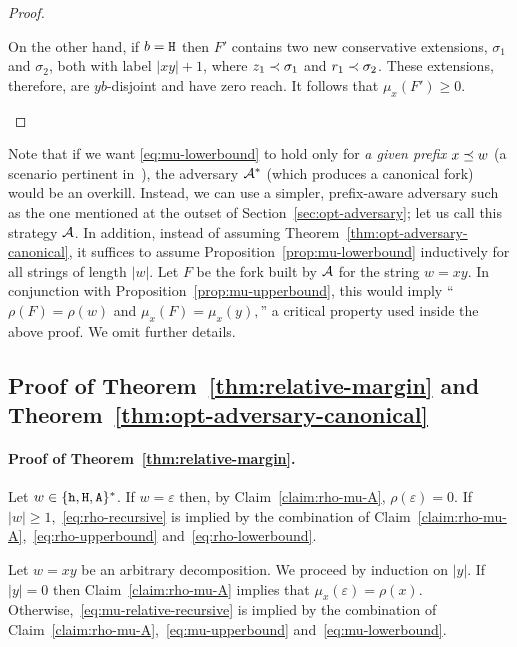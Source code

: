 \begin{proof}
\begin{description}[font=\normalfont\itshape\space]
      On the other hand, if $b = \mathtt{H}$ then 
      $F'$ contains two new conservative extensions, 
      $\sigma_1$ and $\sigma_2$, 
      both with label $|xy| + 1$, 
      where $z_1 \prec \sigma_1$ and $r_1 \prec \sigma_2$.  
      These extensions, therefore, are $yb$-disjoint 
      and have zero reach.
      It follows that $\mu_x(F') \geq 0$.
  \end{description}
\end{proof}


Note that 
if we want \eqref{eq:mu-lowerbound} 
to hold only for \emph{a given prefix} $x \preceq w$ 
(a scenario pertinent in~\cite{LinearConsistencySODA}), 
the adversary $\mathcal{A}^*$ 
(which produces a canonical fork) 
would be an overkill. 
Instead, 
we can use a simpler, prefix-aware adversary 
such as the one mentioned 
at the outset of Section~\ref{sec:opt-adversary}; 
let us call this strategy $\mathcal{A}$. 
In addition, 
instead of assuming Theorem~\ref{thm:opt-adversary-canonical}, 
it suffices to assume 
Proposition~\ref{prop:mu-lowerbound} inductively 
for all strings of length $|w|$. 
Let $F$ be the fork 
built by $\mathcal{A}$ for the string $w = xy$.
In conjunction with Proposition~\ref{prop:mu-upperbound}, 
this would imply ``$\rho(F) = \rho(w)$ and 
$\mu_x(F) = \mu_x(y),$'' 
a critical property used inside the above proof. 
We omit further details.


\subsection{Proof of Theorem~\ref{thm:relative-margin} and Theorem~\ref{thm:opt-adversary-canonical}}



\paragraph{Proof of Theorem~\ref{thm:relative-margin}.}
Let $w \in \{\mathtt{h}, \mathtt{H}, \mathtt{A}\}^*$. 
If $w = \varepsilon$ then, by Claim~\ref{claim:rho-mu-A}, 
$\rho(\varepsilon) = 0$. 
If $|w| \geq 1$,~\eqref{eq:rho-recursive} is implied by 
the combination of 
Claim~\ref{claim:rho-mu-A},~\eqref{eq:rho-upperbound} and~\eqref{eq:rho-lowerbound}. 


Let $w = xy$ be an arbitrary decomposition. 
We proceed by induction on $|y|$. 
If $|y| = 0$ then 
Claim~\ref{claim:rho-mu-A} implies that $\mu_x(\varepsilon) = \rho(x)$. 
Otherwise,~\eqref{eq:mu-relative-recursive} 
is implied by the combination of 
Claim~\ref{claim:rho-mu-A},~\eqref{eq:mu-upperbound} and~\eqref{eq:mu-lowerbound}.

